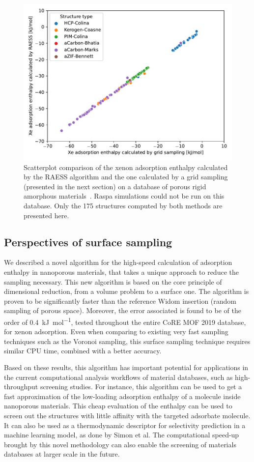\documentclass[main]{subfiles}
\begin{document}
\begin{figure}[ht]
  \centering
    \includegraphics[width=0.5\linewidth]{figures/3-fastsim/amorphous_enthalpy.pdf}
    \caption{Scatterplot comparison of the xenon adsorption enthalpy calculated by the RAESS algorithm and the one calculated by a grid sampling (presented in the next section) on a database of porous rigid amorphous materials~\cite{Thyagarajan_2020}. Raspa simulations could not be run on this database. Only the 175 structures computed by both methods are presented here. }\label{fgr:amorphous}
\end{figure}

\subsection{Perspectives of surface sampling}

We described a novel algorithm for the high-speed calculation of adsorption enthalpy in nanoporous materials, that takes a unique approach to reduce the sampling necessary. This new algorithm is based on the core principle of dimensional reduction, from a volume problem to a surface one. The algorithm is proven to be significantly faster than the reference Widom insertion (random sampling of porous space). Moreover, the error associated is found to be of the order of \SI{0.4}{\kilo\joule\per\mole}, tested throughout the entire CoRE MOF 2019 database, for xenon adsorption. Even when comparing to existing very fast sampling techniques such as the Voronoi sampling, this surface sampling technique requires similar CPU time, combined with a better accuracy. 

Based on these results, this algorithm has important potential for applications in the current computational analysis workflows of material databases, such as high-throughput screening studies. For instance, this algorithm can be used to get a fast approximation of the low-loading adsorption enthalpy of a molecule inside nanoporous materials. This cheap evaluation of the enthalpy can be used to screen out the structures with little affinity with the targeted adsorbate molecule. It can also be used as a thermodynamic descriptor for selectivity prediction in a machine learning model, as done by Simon et al.\cite{Simon_2015} The computational speed-up brought by this novel methodology can also enable the screening of materials databases at larger scale in the future.
\end{document}
